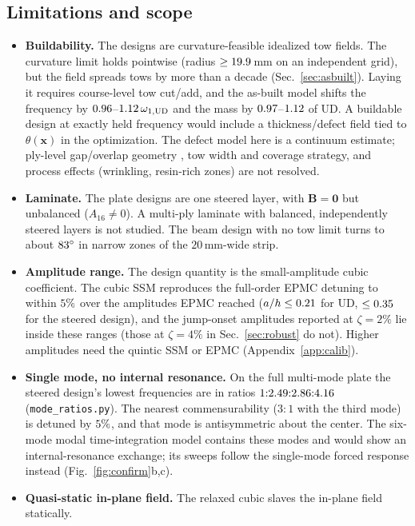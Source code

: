\subsection{Limitations and scope}
\begin{itemize}[itemsep=2pt]
\item \textbf{Buildability.} The designs are curvature-feasible idealized tow fields. The curvature limit
  holds pointwise (radius $\ge19.9$\,mm on an independent grid), but the field spreads tows by more
  than a decade (Sec.~\ref{sec:asbuilt}). Laying it requires course-level tow cut/add, and the as-built
  model shifts the frequency by $0.96$--$1.12\,\omega_{1,\mathrm{UD}}$ and the mass by
  $0.97$--$1.12$ of UD. A buildable design at exactly held frequency would
  include a thickness/defect field tied to $\theta(\bm x)$ in the optimization. The defect model here is a
  continuum estimate; ply-level gap/overlap geometry \cite{fayazbakhsh2013,pagani2025}, tow width and
  coverage strategy, and process effects (wrinkling, resin-rich zones) are not resolved.
\item \textbf{Laminate.} The plate designs are one steered layer, with $\bm B=\bm 0$ but unbalanced
  ($A_{16}\neq0$). A multi-ply laminate with balanced, independently steered layers is not studied.
  The beam design with no tow limit turns to about $83^\circ$ in narrow zones of the
  $20$\,mm-wide strip.
\item \textbf{Amplitude range.} The design quantity is the small-amplitude cubic coefficient. The cubic
  SSM reproduces the full-order EPMC detuning to within $5\%$ over the amplitudes EPMC reached
  ($a/h\le0.21$ for UD, $\le0.35$ for the steered design), and the jump-onset amplitudes
  reported at $\zeta=2\%$ lie inside these ranges (those at $\zeta=4\%$ in Sec.~\ref{sec:robust} do not).
  Higher amplitudes need the quintic SSM or EPMC
  (Appendix~\ref{app:calib}).
\item \textbf{Single mode, no internal resonance.} On the full multi-mode plate the steered design's
  lowest frequencies are in ratios $1{:}2.49{:}2.86{:}4.16$ (\texttt{mode\_\allowbreak ratios.py}). The nearest
  commensurability ($3{:}1$ with the third mode) is detuned by $5\%$, and that mode is
  antisymmetric about the center. The six-mode modal time-integration model contains these modes
  and would show an internal-resonance exchange; its sweeps follow the single-mode forced
  response instead (Fig.~\ref{fig:confirm}b,c).
\item \textbf{Quasi-static in-plane field.} The relaxed cubic slaves the in-plane field statically.

\end{itemize}
